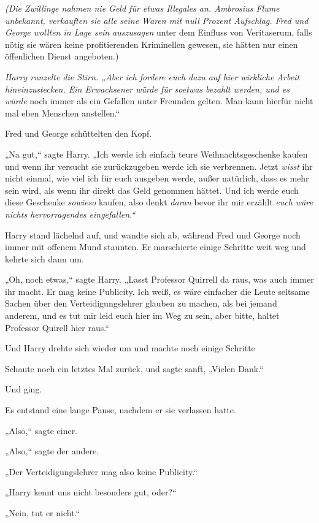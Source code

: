 {\emph{(Die Zwillinge nahmen nie Geld für etwas Illegales an. Ambrosius Flume unbekannt, verkauften sie alle seine Waren mit null Prozent Aufschlag. Fred und George wollten in Lage sein auszusagen \later} unter dem Einfluss von Veritaserum, falls nötig \later sie wären keine profitierenden Kriminellen gewesen, sie hätten nur einen öffenlichen Dienst angeboten.)

\emph{Harry runzelte die Stirn. „Aber ich fordere euch dazu auf hier wirkliche Arbeit hineinzustecken. Ein Erwachsener würde für soetwas bezahlt werden, und es würde} noch immer als ein Gefallen unter Freunden gelten. Man kann hierfür nicht mal eben Menschen anstellen.“

Fred und George schüttelten den Kopf.

„Na gut,“ sagte Harry. „Ich werde ich einfach teure Weihnachtsgeschenke kaufen und wenn ihr versucht sie zurückzugeben werde ich sie verbrennen. Jetzt \emph{wisst} ihr nicht einmal, wie viel ich für euch ausgeben werde, außer natürlich, dass es mehr sein wird, als wenn ihr direkt das Geld genommen hättet. Und ich werde euch diese Geschenke \emph{sowieso} kaufen, also denkt \emph{daran} bevor ihr mir erzählt \emph{euch wäre nichts hervorragendes eingefallen.“}

Harry stand lächelnd auf, und wandte sich ab, während Fred und George noch immer mit offenem Mund staunten. Er marschierte einige Schritte weit weg und kehrte sich dann um.

„Oh, noch etwas,“ sagte Harry. „Lasst Professor Quirrell da raus, was auch immer ihr macht. Er mag keine Publicity. Ich weiß, es wäre einfacher die Leute seltsame Sachen über den Verteidigungslehrer glauben zu machen, als bei jemand anderem, und es tut mir leid euch hier im Weg zu sein, aber bitte, haltet Professor Quirell hier raus.“

Und Harry drehte sich wieder um und machte noch einige Schritte \later

Schaute noch ein letztes Mal zurück, und sagte sanft, „Vielen Dank.“

Und ging.

Es entstand eine lange Pause, nachdem er sie verlassen hatte.

„Also,“ sagte einer.

„Also,“ sagte der andere.

„Der Verteidigungslehrer mag also keine Publicity.“

„Harry kennt uns nicht besonders gut, oder?“

„Nein, tut er nicht.“

}
